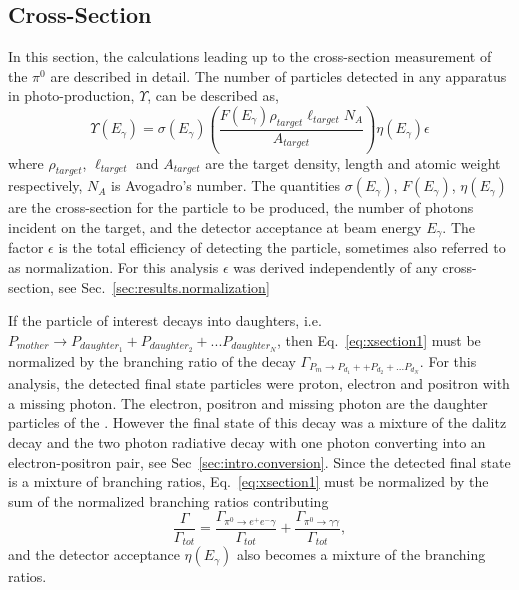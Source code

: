 \subsection{Cross-Section}\label{sec:results.xsection}

In this section, the calculations leading up to the cross-section measurement of the $\pi^0$ are described in detail. The number of particles detected in any apparatus in photo-production, $\Upsilon$, can be described as,
\begin{equation}\label{eq:xsection1}
\Upsilon(E_\gamma) = \sigma(E_\gamma) \left(\frac{F(E_\gamma) \rho_{target}\ell_{target}N_A}{A_{target}}\right)\eta(E_\gamma)\epsilon
\end{equation}
where $\rho_{target}$, $\ell_{target}$ and $A_{target}$ are the target density, length and atomic weight respectively, $N_A$ is Avogadro's number. The quantities $\sigma(E_\gamma)$, $F(E_\gamma)$, $\eta(E_\gamma)$ are the cross-section for the particle to be produced, the number of photons incident on the target, and the detector acceptance at beam energy $E_\gamma$. The factor $\epsilon$ is the total efficiency of detecting the particle, sometimes also referred to as normalization. For this analysis $\epsilon$ was derived independently of any cross-section, see Sec.~\ref{sec:results.normalization}

If the particle of interest decays into daughters, i.e. $P_{mother}\rightarrow P_{daughter_1} +P_{daughter_2} + ...P_{daughter_N}$, then Eq.~\ref{eq:xsection1} must be normalized by the branching ratio of the decay $\Gamma_{P_{m}\rightarrow P_{d_1} + +P_{d_2} + ...P_{d_N}}$. For this analysis, the detected final state particles were proton, electron and positron with a missing photon. The electron, positron and missing photon are the daughter particles of the \pizT. However the final state of this decay was a mixture of the \pizT dalitz decay and the \pizT two photon radiative decay with one photon converting into an electron-positron pair, see Sec~\ref{sec:intro.conversion}. Since the detected final state is a mixture of branching ratios, Eq.~\ref{eq:xsection1} must be normalized by the sum of the normalized branching ratios contributing
\begin{equation}\label{eq:xsectionBR}
 \frac{\Gamma}{\Gamma_{tot}} = \frac{\Gamma_{\pi^{0}\rightarrow e^{+}e^{-}\gamma}}{\Gamma_{tot}} + \frac{\Gamma_{\pi^{0}\rightarrow \gamma \gamma}}{\Gamma_{tot}},
\end{equation}
and the detector acceptance $\eta(E_\gamma)$ also becomes a mixture of the branching ratios.

